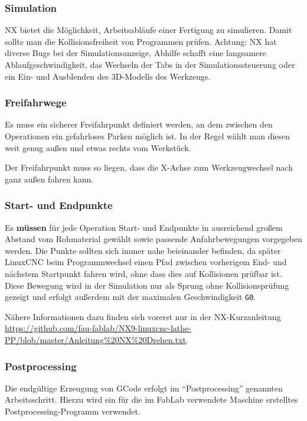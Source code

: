 \documentclass{\basedir/fablab-document}
\begin{document}
\subsubsection{Simulation}

NX bietet die Möglichkeit, Arbeitsabläufe einer Fertigung zu simulieren. Damit sollte man die Kollisionsfreiheit von Programmen prüfen. Achtung: NX hat diverse Bugs bei der Simulationsanzeige, Abhilfe schafft eine langsamere Ablaufgeschwindigkeit, das Wechseln der Tabs in der Simulationssteuerung oder ein Ein- und Ausblenden des 3D-Modells des Werkzeugs.

\subsubsection{Freifahrwege}
Es muss ein sicherer Freifahrpunkt definiert werden, an dem zwischen den Operationen ein gefahrloses Parken möglich ist. In der Regel wählt man diesen weit genug außen und etwas rechts vom Werkstück.

Der Freifahrpunkt muss so liegen, dass die X-Achse zum Werkzeugwechsel nach ganz außen fahren kann.

\subsubsection{Start- und Endpunkte}

Es \textbf{müssen} für jede Operation Start- und Endpunkte in ausreichend großem Abstand vom Rohmaterial gewählt sowie passende Anfahrbewegungen vorgegeben werden. Die Punkte sollten sich immer nahe beieinander befinden, da später LinuxCNC beim Programmwechsel einen Pfad zwischen vorherigem End- und nächstem Startpunkt fahren wird, ohne dass dies auf Kollisionen prüfbar ist.
Diese Bewegung wird in der Simulation nur als Sprung ohne Kollisionsprüfung gezeigt und erfolgt außerdem mit der maximalen Geschwindigkeit \texttt{G0}.

Nähere Informationen dazu finden sich vorerst nur in der NX-Kurzanleitung \url{https://github.com/fau-fablab/NX9-linuxcnc-lathe-PP/blob/master/Anleitung%20NX%20Drehen.txt}.

\subsubsection{Postprocessing}

Die endgültige Erzeugung von GCode erfolgt im "`Postprocessing"' genannten Arbeitsschritt. Hierzu wird ein für die im FabLab verwendete Maschine erstelltes Postprocessing-Programm verwendet. 
\end{document}
